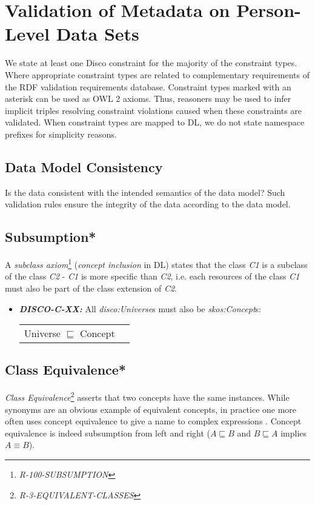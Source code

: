 \documentclass{llncs}
\newenvironment{DL}{
  \vspace{0cm}
  \begin{tabular}{r l}

}{
  \end{tabular}
}
\begin{document}
\section{Validation of Metadata on Person-Level Data Sets}

We state at least one Disco constraint for the majority of the constraint types.
Where appropriate constraint types are related to complementary requirements of the RDF validation requirements database.
Constraint types marked with an asterisk can be used as OWL 2 axioms.
Thus, reasoners may be used to infer implicit triples resolving constraint violations caused when these constraints are validated.
When constraint types are mapped to DL, we do not state namespace prefixes for simplicity reasons.

\subsection{Data Model Consistency}

Is the data consistent with the intended semantics of the data model?
Such validation rules ensure the integrity of the data according to the data model.

\subsection{Subsumption*}

A \emph{subclass axiom}\footnote{{\em R-100-SUBSUMPTION}} ({\em concept inclusion} in DL) states that the class \emph{C1} is a subclass of the class \emph{C2} - \emph{C1} is more specific than \emph{C2}, 
i.e. each resources of the class \emph{C1} must also be part of the class extension of \emph{C2}.

\begin{itemize}
	\item \textbf{{\em DISCO-C-XX:}} 
All {\em disco:Universe}s must also be {\em skos:Concept}s:

\begin{DL}
Universe $\sqsubseteq$ Concept
\end{DL}
\end{itemize}

\subsection{Class Equivalence*}

{\em Class Equivalence}\footnote{{\em R-3-EQUIVALENT-CLASSES}} asserts that two concepts have the same instances.
While synonyms are an obvious example of equivalent concepts, in practice one more
often uses concept equivalence to give a name to complex expressions \cite{Kroetzsch2012}.
Concept equivalence is indeed subsumption from left and right ($A \sqsubseteq B$ and $B \sqsubseteq A$ implies $A \equiv B$).
\end{document}
